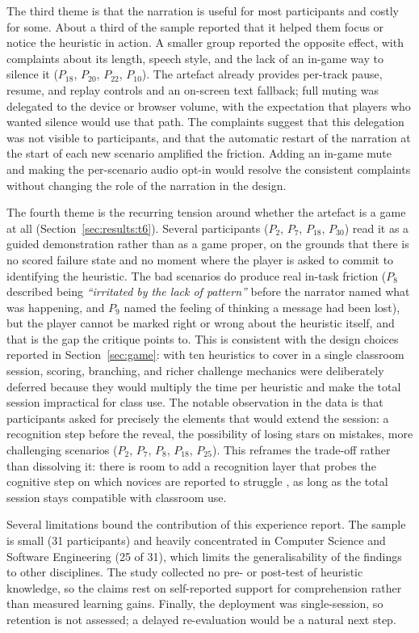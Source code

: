 The third theme is that the narration is useful for most participants and costly for some. About a third of the sample reported that it helped them focus or notice the heuristic in action. A smaller group reported the opposite effect, with complaints about its length, speech style, and the lack of an in-game way to silence it ($P_{18}$, $P_{20}$, $P_{22}$, $P_{10}$). The artefact already provides per-track pause, resume, and replay controls and an on-screen text fallback; full muting was delegated to the device or browser volume, with the expectation that players who wanted silence would use that path. The complaints suggest that this delegation was not visible to participants, and that the automatic restart of the narration at the start of each new scenario amplified the friction. Adding an in-game mute and making the per-scenario audio opt-in would resolve the consistent complaints without changing the role of the narration in the design.

The fourth theme is the recurring tension around whether the artefact is a game at all (Section~\ref{sec:results:t6}). Several participants ($P_2$, $P_7$, $P_{18}$, $P_{30}$) read it as a guided demonstration rather than as a game proper, on the grounds that there is no scored failure state and no moment where the player is asked to commit to identifying the heuristic. The bad scenarios do produce real in-task friction ($P_8$ described being \textit{``irritated by the lack of pattern''} before the narrator named what was happening, and $P_9$ named the feeling of thinking a message had been lost), but the player cannot be marked right or wrong about the heuristic itself, and that is the gap the critique points to. This is consistent with the design choices reported in Section~\ref{sec:game}: with ten heuristics to cover in a single classroom session, scoring, branching, and richer challenge mechanics were deliberately deferred because they would multiply the time per heuristic and make the total session impractical for class use. The notable observation in the data is that participants asked for precisely the elements that would extend the session: a recognition step before the reveal, the possibility of losing stars on mistakes, more challenging scenarios ($P_2$, $P_7$, $P_8$, $P_{18}$, $P_{25}$). This reframes the trade-off rather than dissolving it: there is room to add a recognition layer that probes the cognitive step on which novices are reported to struggle \cite{nielsen1992finding,abulfaraj2020detailed}, as long as the total session stays compatible with classroom use.

Several limitations bound the contribution of this experience report. The sample is small (31 participants) and heavily concentrated in Computer Science and Software Engineering (25 of 31), which limits the generalisability of the findings to other disciplines. The study collected no pre- or post-test of heuristic knowledge, so the claims rest on self-reported support for comprehension rather than measured learning gains. Finally, the deployment was single-session, so retention is not assessed; a delayed re-evaluation would be a natural next step.
